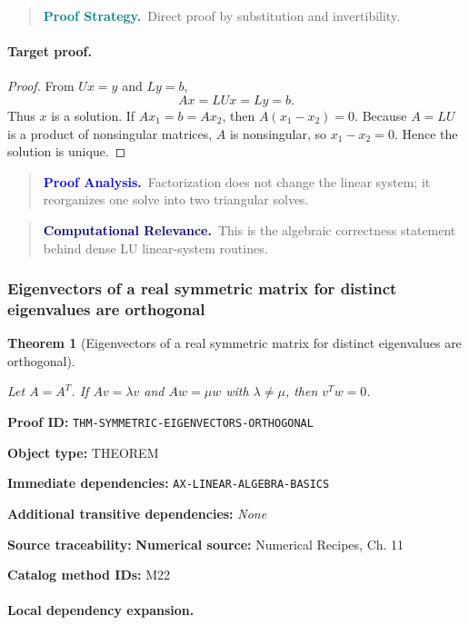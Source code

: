 \documentclass[10pt]{article}
\newcommand{\pidraw}[1]{\begingroup\urlstyle{tt}\nolinkurl{#1}\endgroup}
\newtheorem{theorem}{Theorem}[section]
\theoremstyle{definition}
\theoremstyle{remark}
\newenvironment{proofstrategy}
{\begin{quote}\small\noindent\textbf{\textcolor{teal}{Proof Strategy.}}\ }
{\end{quote}}
\newenvironment{proofanalysis}
{\begin{quote}\small\noindent\textbf{\textcolor{blue}{Proof Analysis.}}\ }
{\end{quote}}
\newenvironment{computationalrelevance}
{\begin{quote}\small\noindent\textbf{\textcolor{navy}{Computational Relevance.}}\ }
{\end{quote}}
\newcommand{\meta}[2]{\noindent\textbf{#1:} #2\par}
\begin{document}
\begin{proofstrategy}Direct proof by substitution and invertibility.\end{proofstrategy}

\paragraph{Target proof.}

\begin{proof}

From $Ux=y$ and $Ly=b$,
\[
Ax=LUx=Ly=b.
\]
Thus $x$ is a solution. If $Ax_1=b=Ax_2$, then
$A(x_1-x_2)=0$. Because $A=LU$ is a product of nonsingular matrices, $A$ is
nonsingular, so $x_1-x_2=0$. Hence the solution is unique.

\end{proof}

\begin{proofanalysis}Factorization does not change the linear system; it reorganizes one solve into two triangular solves.\end{proofanalysis}

\begin{computationalrelevance}This is the algebraic correctness statement behind dense LU linear-system routines.\end{computationalrelevance}

\subsubsection{Eigenvectors of a real symmetric matrix for distinct eigenvalues are orthogonal}

\begin{theorem}[Eigenvectors of a real symmetric matrix for distinct eigenvalues are orthogonal]\label{prf:THM-SYMMETRIC-EIGENVECTORS-ORTHOGONAL}

Let $A=A^T$. If $Av=\lambda v$ and $Aw=\mu w$ with $\lambda\ne\mu$, then $v^Tw=0$.

\end{theorem}

\meta{Proof ID}{\pidraw{THM-SYMMETRIC-EIGENVECTORS-ORTHOGONAL}}
\meta{Object type}{THEOREM}
\meta{Immediate dependencies}{\pidraw{AX-LINEAR-ALGEBRA-BASICS}}
\meta{Additional transitive dependencies}{\emph{None}}
\meta{Source traceability}{\textbf{Numerical source:} Numerical Recipes, Ch. 11}
\meta{Catalog method IDs}{M22}

\paragraph{Local dependency expansion.}
\end{document}
